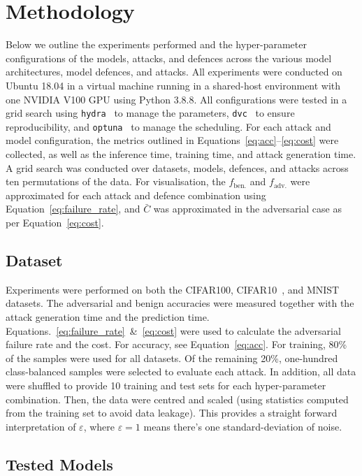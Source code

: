 \section{Methodology}
\label{methods}
Below we outline the experiments performed and the hyper-parameter configurations of the models, attacks, and defences across the various model architectures, model defences, and attacks. All experiments were conducted on Ubuntu 18.04 in a virtual machine running in a shared-host environment with one NVIDIA V100 GPU using Python 3.8.8. All configurations were tested in a grid search using \texttt{hydra}~\cite{hydra} to manage the parameters, \texttt{dvc}~\cite{dvc} to ensure reproducibility, and \texttt{optuna}~\cite{optuna} to manage the scheduling. For each attack and model configuration, the metrics outlined in Equations~\ref{eq:acc}--\ref{eq:cost} were collected, as well as the inference time, training time, and attack generation time. A grid search was conducted over datasets, models, defences, and attacks across ten permutations of the data. For visualisation, the $f_{\mathrm{ben.}}$ and $f_{\mathrm{adv.}}$ were approximated for each attack and defence combination using Equation~\ref{eq:failure_rate}, and $\bar{C}$ was approximated in the adversarial case as per Equation~\ref{eq:cost}.



\subsection{Dataset}
\label{dataset}

Experiments were performed on both the CIFAR100, CIFAR10~\cite{cifar}, and MNIST~\cite{mnist} datasets. The adversarial and benign accuracies were measured together with the attack generation time and the prediction time. Equations.~\ref{eq:failure_rate}~\&~\ref{eq:cost} were used to calculate the adversarial failure rate and the cost. For accuracy, see Equation~\ref{eq:acc}. For training, 80\% of the samples were used for all datasets. Of the remaining 20\%, one-hundred class-balanced samples were selected to evaluate each attack. In addition, all data were shuffled to provide 10 training and test sets for each hyper-parameter combination. Then, the data were centred and scaled (using statistics computed from the training set to avoid data leakage). This provides a straight forward interpretation of $\varepsilon$, where $\varepsilon = 1$ means there's one standard-deviation of noise.   


\subsection{Tested Models}
\label{models}

